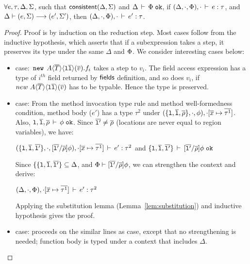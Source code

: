 \begin{lemma}[preservation]
\label{lem:preservation}
$\forall e, \tau, \Delta, \Sigma$, such that ${\sf consistent}(\Delta,\Sigma)$
and $\Delta\,\vdash\,\Phi \; \texttt{ok}$, if $(\Delta,\cdot,\Phi),
\cdot\,\vdash\,e:\tau$, and $\Delta \vdash (e,\Sigma) \longrightarrow (e',\Sigma')$, then 
$(\Delta,\cdot,\Phi),\cdot\,\vdash\,e':\tau$.
\end{lemma}
\begin{proof}
  Proof is by induction on the reduction step. Most cases follow from
  the inductive hypothesis, which asserts that if a subexpression
  takes a step, it preserves its type under the same $\Delta$ and
  $\Phi$. We consider interesting cases below:
  \begin{itemize}
    \item {} case: $\,{\tt new}\,\; A\langle \overline{T} \rangle
    \langle \mathtt{l}\overline{\mathtt{l}} \rangle(\overline{v}).f_i$ takes a step to $v_i$. The field
    access expression has a type of $i^{th}$ field returned by
    ${\sf fields}$ definition, and so does $v_i$, if ${new}\;
    A\langle \overline{T} \rangle \langle \mathtt{l}\overline{\mathtt{l}} \rangle(\overline{v})$ has to be typable.
    Hence the type is preserved.

    \item {} case: From the method invocation type rule
    and method well-formedness condition, method body ($e'$) has a type
    $\tau^2$ under $(\{\mathtt{l},\overline{\mathtt{l}},\overline{\rho}\},\cdot,\phi),\cdot[\overline{x}
    \mapsto \overline{\tau^1}]$. Also,
    $\mathtt{l},\overline{\mathtt{l}},\overline{\rho}\,\vdash\,\phi \; \texttt{ok}$. Since $\overline{\mathtt{l}'} \neq \overline{\rho}$
    (locations are never equal to region variables), we have:
    \begin{center}
    $(\{\mathtt{l},\overline{\mathtt{l}},\overline{\mathtt{l}'}\},\cdot,[\overline{\mathtt{l}'}/\overline{\rho}]\phi),\cdot[\overline{x}
    \mapsto \overline{\tau^1}]\,\vdash\,e':\tau^2$ and
    $\{\mathtt{l},\overline{\mathtt{l}},\overline{\mathtt{l}'}\}\,\vdash\,[\overline{\mathtt{l}'}/\overline{\rho}]\phi \; \texttt{ok}$
    \end{center}
    Since $\{\{\mathtt{l},\overline{\mathtt{l}},\overline{\mathtt{l}'}\} \subseteq \Delta$, and
    $\Phi \vdash [\overline{\mathtt{l}'}/\overline{\rho}]\phi$, we can strengthen
    the context and derive:
    \begin{center}
      $(\Delta,\cdot,\Phi),\cdot[\overline{x} \mapsto \overline{\tau^1}]\,\vdash\,e':\tau^2$
    \end{center}
    Applying the substitution lemma (Lemma~\ref{lem:substitution}) and
    inductive hypothesis gives the proof.

    \item {} case: proceeds on the similar lines as
     case, except that no strengthening is needed;
    function body is typed under a context that includes $\Delta$.


\end{itemize}
\end{proof}
